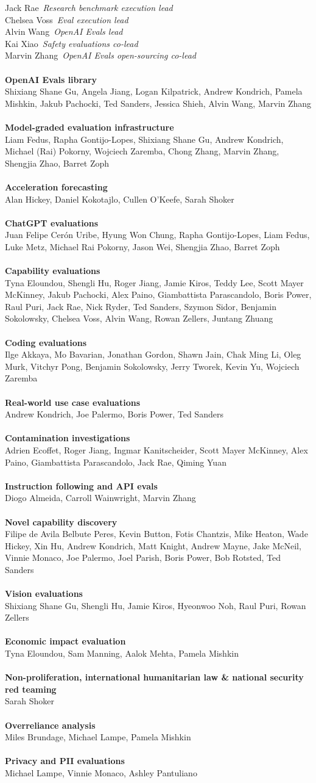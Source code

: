 \documentclass{article}
\newcommand{\creditlistheader}[1]{\textbf{#1}\footnotemark[\thefootnote]\\}
\newcommand{\creditlist}[2]{\creditlistheader{#1}#2\\
\\}
\newcommand{\corecontributor}[2]{#1\ \textit{#2}\\}
\begin{document}
\begin{multicols}{2}
\corecontributor{Jack Rae}{Research benchmark execution lead}
\corecontributor{Chelsea Voss}{Eval execution lead}
\corecontributor{Alvin Wang}{OpenAI Evals lead}
\corecontributor{Kai Xiao}{Safety evaluations co-lead}
\corecontributor{Marvin Zhang}{OpenAI Evals open-sourcing co-lead}
\\
\creditlist{OpenAI Evals library}{Shixiang Shane Gu, Angela Jiang, Logan Kilpatrick, Andrew Kondrich, Pamela Mishkin, Jakub Pachocki, Ted Sanders, Jessica Shieh, Alvin Wang, Marvin Zhang}
\creditlist{Model-graded evaluation infrastructure}{Liam Fedus, Rapha Gontijo-Lopes, Shixiang Shane Gu, Andrew Kondrich, Michael (Rai) Pokorny, Wojciech Zaremba, Chong Zhang, Marvin Zhang, Shengjia Zhao, Barret Zoph}
\creditlist{Acceleration forecasting}{Alan Hickey, Daniel Kokotajlo, Cullen O’Keefe, Sarah Shoker}
\creditlist{ChatGPT evaluations}{Juan Felipe Cerón Uribe, Hyung Won Chung, Rapha Gontijo-Lopes, Liam Fedus, Luke Metz, Michael Rai Pokorny, Jason Wei, Shengjia Zhao, Barret Zoph}
\creditlist{Capability evaluations}{Tyna Eloundou, Shengli Hu, Roger Jiang, Jamie Kiros, Teddy Lee, Scott Mayer McKinney, Jakub Pachocki, Alex Paino, Giambattista Parascandolo, Boris Power, Raul Puri, Jack Rae, Nick Ryder, Ted Sanders, Szymon Sidor, Benjamin Sokolowsky, Chelsea Voss, Alvin Wang, Rowan Zellers, Juntang Zhuang}
\creditlist{Coding evaluations}{Ilge Akkaya, Mo Bavarian, Jonathan Gordon, Shawn Jain, Chak Ming Li, Oleg Murk, Vitchyr Pong, Benjamin Sokolowsky, Jerry Tworek, Kevin Yu, Wojciech Zaremba}
\creditlist{Real-world use case evaluations}{Andrew Kondrich, Joe Palermo, Boris Power, Ted Sanders}
\creditlist{Contamination investigations}{Adrien Ecoffet, Roger Jiang, Ingmar Kanitscheider, Scott Mayer McKinney, Alex Paino, Giambattista Parascandolo, Jack Rae, Qiming Yuan}
\creditlist{Instruction following and API evals}{Diogo Almeida, Carroll Wainwright, Marvin Zhang}
\creditlist{Novel capability discovery}{Filipe de Avila Belbute Peres, Kevin Button, Fotis Chantzis, Mike Heaton, Wade Hickey, Xin Hu, Andrew Kondrich, Matt Knight, Andrew Mayne, Jake McNeil, Vinnie Monaco, Joe Palermo, Joel Parish, Boris Power, Bob Rotsted, Ted Sanders}
\creditlist{Vision evaluations}{Shixiang Shane Gu, Shengli Hu, Jamie Kiros, Hyeonwoo Noh, Raul Puri, Rowan Zellers}
\creditlist{Economic impact evaluation}{Tyna Eloundou, Sam Manning, Aalok Mehta, Pamela Mishkin}
\creditlist{Non-proliferation, international humanitarian law \& national security red teaming}{Sarah Shoker}
\creditlist{Overreliance analysis}{Miles Brundage, Michael Lampe, Pamela Mishkin}
\creditlist{Privacy and PII evaluations}{Michael Lampe, Vinnie Monaco, Ashley Pantuliano}

\end{multicols}
\end{document}
